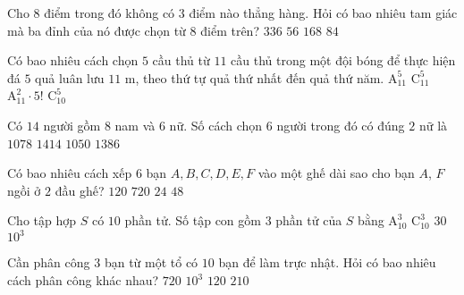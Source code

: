 \begin{ex}%
Cho $8$ điểm trong đó không có $3$ điểm nào thẳng hàng. Hỏi có bao nhiêu tam giác mà ba đỉnh của nó được chọn từ $8$ điểm trên?
\choice
{$336$}
{\True $56$}
{$168$}
{$84$}
\end{ex}

\begin{ex}%
Có bao nhiêu cách chọn $5$ cầu thủ từ $11$ cầu thủ trong một đội bóng để thực hiện đá $5$ quả luân lưu $11$ m, theo thứ tự quả thứ nhất đến quả thứ năm.
\choice
{\True $\mathrm{A}_{11}^{5}$}
{$\mathrm{C}_{11}^{5}$}
{$\mathrm{A}_{11}^{2} \cdot 5!$}
{$\mathrm{C}_{10}^{5}$}
\end{ex}

\begin{ex}%
Có $14$ người gồm $8$ nam và $6$ nữ. Số cách chọn $6$ người trong đó có đúng $2$ nữ là
\choice
{$1078$}
{$1414$}
{\True $1050$}
{$1386$}
\end{ex}

\begin{ex}%
Có bao nhiêu cách xếp $6$ bạn $A, B, C, D, E, F$ vào một ghế dài sao cho bạn $A$, $F$ ngồi ở $2$ đầu ghế?
\choice
{$120$}
{$720$}
{$24$}
{\True $48$}
\end{ex}

\begin{ex}%
Cho tập hợp $S$ có $10$ phần tử. Số tập con gồm $3$ phần tử của $S$ bằng
\choice
{$\mathrm{A}_{10}^{3}$}
{\True $\mathrm{C}_{10}^{3}$}
{$30$}
{$10^{3}$}
\end{ex}

\begin{ex}%
Cần phân công $3$ bạn từ một tổ có $10$ bạn để làm trực nhật. Hỏi có bao nhiêu cách phân công khác nhau?
\choice
{$720$}
{$10^{3}$}
{\True $120$}
{$210$}
\end{ex}

